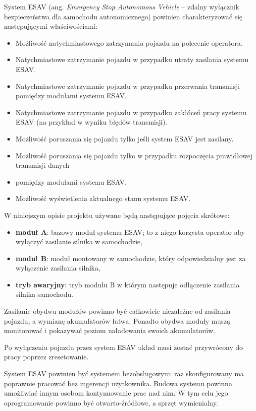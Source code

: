 System ESAV (ang. \textit{Emergency Stop Autonomous Vehicle} – zdalny wyłącznik bezpieczeństwa dla samochodu autonomicznego) powinien charakteryzować się następującymi właściwościami:

\begin{itemize}
\item Możliwość natychmiastowego zatrzymania pojazdu na polecenie operatora.
\item Natychmiastowe zatrzymanie pojazdu w przypadku utraty zasilania systemu ESAV.
\item Natychmiastowe zatrzymanie pojazdu w przypadku przerwania transmisji pomiędzy modułami systemu ESAV.
\item Natychmiastowe zatrzymanie pojazdu w przypadku zakłóceń pracy systemu ESAV (na przykład w wyniku błędów transmisji).
\item Możliwość poruszania się pojazdu tylko jeśli system ESAV jest zasilany.
\item Możliwość poruszania się pojazdu tylko w przypadku rozpoczęcia prawidłowej transmisji danych \item pomiędzy modułami systemu ESAV.
\item Możliwość wyświetlenia aktualnego stanu systemu ESAV.
\end{itemize}

W niniejszym opisie projektu używane będą następujące pojęcia skrótowe:
\begin{itemize}
\item \textbf{moduł A}: bazowy moduł systemu ESAV; to z niego korzysta operator aby wyłączyć zasilanie silnika w samochodzie,
\item \textbf{moduł B}: moduł montowany w samochodzie, który odpowiedzialny jest za wyłączenie zasilania silnika,
\item \textbf{tryb awaryjny}: tryb modułu B w którym następuje odłączenie zasilania silnika samochodu.
\end{itemize}

Zasilanie obydwu modułów powinno być całkowicie niezależne od zasilania pojazdu, a wymianę akumulatorów łatwa. Ponadto obydwa moduły muszą monitorować i pokazywać poziom naładowania swoich akumulatorów.

Po wyłączeniu pojazdu przez system ESAV układ musi zostać przywrócony do pracy poprzez zresetowanie.

System ESAV powinien być systemem bezobsługowym: raz skonfigurowany ma poprawnie pracować bez ingerencji użytkownika. Budowa systemu powinna umożliwiać innym osobom kontynuowanie prac nad nim. W tym celu jego oprogramowanie powinno być otwarto-źródłowe, a sprzęt wymienialny.

